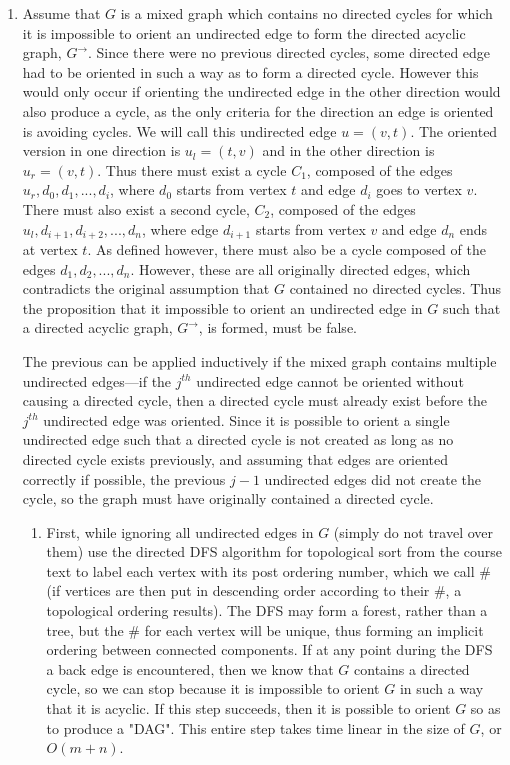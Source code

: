 \documentclass{article}
\begin{document}
\begin{enumerate}
\item Assume that $G$ is a mixed graph which contains no directed cycles for which it is impossible to orient an undirected edge to form the directed acyclic graph, $G^{\rightarrow}$. Since there were no previous directed cycles, some directed edge had to be oriented in such a way as to form a directed cycle.  However this would only occur if orienting the undirected edge in the other direction would also produce a cycle, as the only criteria for the direction an edge is oriented is avoiding cycles. We will call this undirected edge $u = (v,t)$.  The oriented version in one direction is $u_l = (t,v)$ and in the other direction is $u_r = (v,t)$. Thus there must exist a cycle $C_1$, composed of the edges $u_r,d_0,d_1,...,d_i$, where $d_0$ starts from vertex $t$ and edge $d_i$ goes to vertex $v$.  There must also exist a second cycle, $C_2$, composed of the edges $u_l,d_{i+1},d_{i+2},...,d_n$, where edge $d_{i+1}$ starts from vertex $v$ and edge $d_n$ ends at vertex $t$. As defined however, there must also be a cycle composed of the edges $d_1,d_2,...,d_n$.  However, these are all originally directed edges, which contradicts the original assumption that $G$ contained no directed cycles. Thus the proposition that it impossible to orient an undirected edge in $G$ such that a directed acyclic graph, $G^{\rightarrow}$, is formed, must be false.

\par The previous can be applied inductively if the mixed graph contains multiple undirected edges---if the $j^{th}$ undirected edge cannot be oriented without causing a directed cycle, then a directed cycle must already exist before the $j^{th}$ undirected edge was oriented. Since it is possible to orient a single undirected edge such that a directed cycle is not created as long as no directed cycle exists previously, and assuming that edges are oriented correctly if possible, the previous $j-1$ undirected edges did not create the cycle, so the graph must have originally contained a directed cycle.

\begin{enumerate}
\item First, while ignoring all undirected edges in $G$ (simply do not travel over them) use the directed DFS algorithm for topological sort from the course text to label each vertex with its post ordering number, which we call $\#$ (if vertices are then put in descending order according to their $\#$, a topological ordering results). The DFS may form a forest, rather than a tree, but the $\#$ for each vertex will be unique, thus forming an implicit ordering between connected components. If at any point during the DFS a back edge is encountered, then we know that $G$ contains a directed cycle, so we can stop because it is impossible to orient $G$ in such a way that it is acyclic. If this step succeeds, then it is possible to orient $G$ so as to produce a "DAG". This entire step takes time linear in the size of $G$, or $O(m + n)$.


\end{enumerate}
\end{enumerate}
\end{document}
